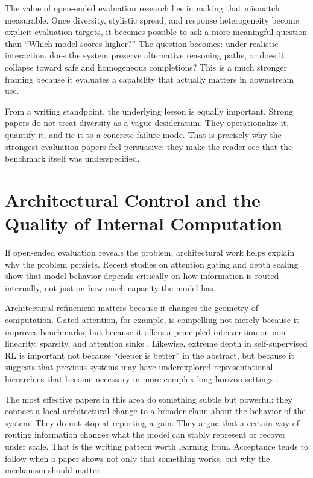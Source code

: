 \documentclass[10pt,twocolumn]{article}
\begin{document}
The value of open-ended evaluation research lies in making that mismatch measurable. Once diversity, stylistic spread, and response heterogeneity become explicit evaluation targets, it becomes possible to ask a more meaningful question than ``Which model scores higher?'' The question becomes: under realistic interaction, does the system preserve alternative reasoning paths, or does it collapse toward safe and homogeneous completions? This is a much stronger framing because it evaluates a capability that actually matters in downstream use.

From a writing standpoint, the underlying lesson is equally important. Strong papers do not treat diversity as a vague desideratum. They operationalize it, quantify it, and tie it to a concrete failure mode. That is precisely why the strongest evaluation papers feel persuasive: they make the reader see that the benchmark itself was underspecified.

\section{Architectural Control and the Quality of Internal Computation}
If open-ended evaluation reveals the problem, architectural work helps explain why the problem persists. Recent studies on attention gating and depth scaling show that model behavior depends critically on how information is routed internally, not just on how much capacity the model has.

Architectural refinement matters because it changes the geometry of computation. Gated attention, for example, is compelling not merely because it improves benchmarks, but because it offers a principled intervention on non-linearity, sparsity, and attention sinks \citep{gated2025}. Likewise, extreme depth in self-supervised RL is important not because ``deeper is better'' in the abstract, but because it suggests that previous systems may have underexplored representational hierarchies that become necessary in more complex long-horizon settings \citep{wang2025rl}.

The most effective papers in this area do something subtle but powerful: they connect a local architectural change to a broader claim about the behavior of the system. They do not stop at reporting a gain. They argue that a certain way of routing information changes what the model can stably represent or recover under scale. That is the writing pattern worth learning from. Acceptance tends to follow when a paper shows not only that something works, but why the mechanism should matter.
\end{document}
